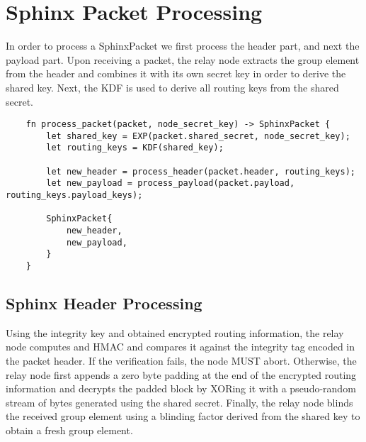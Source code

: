 \section{Sphinx Packet Processing}\label{sec:process}

In order to process a SphinxPacket we first process the header part, and next the payload part. 
Upon receiving a packet, the relay node extracts the group element from the header and combines it with its own secret key in order to derive the shared key. Next, the KDF is used to derive all routing keys from the shared secret. 

\begin{verbatim}
    fn process_packet(packet, node_secret_key) -> SphinxPacket {
        let shared_key = EXP(packet.shared_secret, node_secret_key);
        let routing_keys = KDF(shared_key);
        
        let new_header = process_header(packet.header, routing_keys);
        let new_payload = process_payload(packet.payload, routing_keys.payload_keys);
        
        SphinxPacket{
            new_header, 
            new_payload,
        }
    }
\end{verbatim}

\subsection{Sphinx Header Processing}

Using the integrity key and obtained encrypted routing information, the relay node computes and HMAC and compares it against the integrity tag encoded in the packet header. If the verification fails, the node MUST abort. Otherwise, the relay node first appends a zero byte padding at the end of the encrypted routing information and decrypts the padded block by XORing it with a pseudo-random stream of bytes generated using the shared secret. Finally, the relay node blinds the received group element using a blinding factor derived from the shared key to obtain a fresh group element. 


